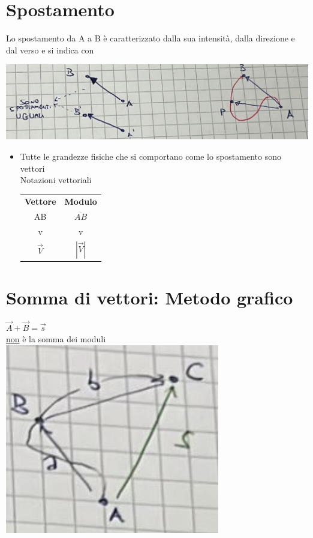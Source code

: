 \documentclass{report}
\begin{document}
\section{Spostamento}
Lo spostamento da A a B è caratterizzato dalla sua intensità, dalla direzione e dal verso e si indica con
\begin{center}
  \includegraphics[scale=0.3]{img1.png}

\end{center}
\begin{itemize}
  \item Tutte le grandezze fisiche che si comportano come lo spostamento sono vettori\\Notazioni vettoriali\\\begin{tabular}{cc}
          \textbf{Vettore} & \textbf{Modulo} \\
          {AB}             & $\overline{AB}$ \\
          v                & v               \\
          $\vec{V}$        & $|\vec{V}|$
        \end{tabular}
\end{itemize}
\section{Somma di vettori: Metodo grafico}

$\vec{A}+\vec{B}=\vec{s}$\\
\underline{non} è la somma dei moduli\\
\includegraphics[scale=0.3]{img2.png}
\end{document}
